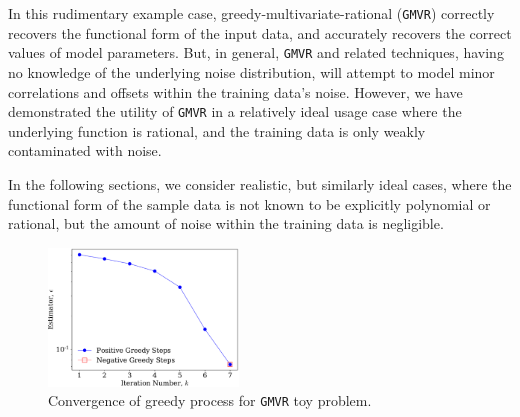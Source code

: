\documentclass[twocolumn,aps,prd,floatfix,preprintnumbers,a4paper,nofootinbib,
superscriptaddress,10pt]{revtex4-1}
\def\gmvr#1{greedy-multivariate-rational#1
  (\texttt{GMVR}#1)\gdef\gmvr{\texttt{GMVR}}}
\begin{document}
%
%
\par In this rudimentary example case, \gmvr{} correctly recovers the functional form of the input data, and accurately recovers the correct values of model parameters.
%
But, in general, \gmvr{} and related techniques, having no knowledge of the underlying noise distribution, will attempt to model minor correlations and offsets within the training data's noise.
%
However, we have demonstrated the utility of \gmvr{} in a relatively ideal usage case where the underlying function is rational, and the training data is only weakly contaminated with noise.
%
\par In the following sections, we consider realistic, but similarly ideal cases, where the functional form of the sample data is not known to be explicitly polynomial or rational, but the amount of noise within the training data is negligible.
%
\begin{figure}[htb]
  \includegraphics[width=0.45\textwidth]{issue3_pgreedy.pdf}
	\caption{ Convergence of greedy process for \gmvr{} toy problem. }
\end{figure}
%
%
%
%
\end{document}
